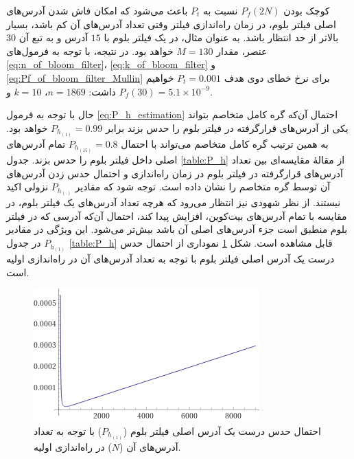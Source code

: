 کوچک بودن 
$P_f(2N)$
نسبت به  
$P_t$
باعث می‌شود که امکان فاش شدن آدرس‌های اصلی فیلتر بلوم، در زمان راه‌اندازی فیلتر وقتی تعداد آدرس‌های آن کم باشد، بسیار بالاتر از حد انتظار باشد. به عنوان مثال، در یک فیلتر بلوم با $15$ آدرس و به تبع آن $30$ عنصر، مقدار $M=130$ خواهد بود. در نتیجه، با توجه به فرمول‌های 
\eqref{eq:n_of_bloom_filter}،
\eqref{eq:k_of_bloom_filter} و
\eqref{eq:Pf_of_bloom_filter_Mullin}
 برای نرخ خطای دوی هدف
$P_t=0.001$
 خواهیم داشت:
$n=1869$،
$k=10$ و
$P_f(30)=5.1\times10^{-9}$.

حال با توجه به فرمول \eqref{eq:P_h_estimation} احتمال آن‌که گره کامل متخاصم بتواند  یکی از آدرس‌های قرارگرفته در فیلتر بلوم را حدس بزند برابر 
$P_{h_{(1)}} = 0.99$
خواهد بود. به همین ترتیب گره کامل متخاصم می‌تواند با احتمال
$P_{h_{(15)}} = 0.8$
تمام آدرس‌های اصلی داخل فیلتر بلوم را حدس بزند. جدول \ref{table:P_h} از مقالهٔ \cite{Gervais2014} مقایسه‌ای بین تعداد آدرس‌های قرارگرفته در فیلتر بلوم در زمان راه‌اندازی و احتمال حدس زدن آدرس‌های آن توسط گره متخاصم را نشان داده است. توجه شود که مقادیر
$P_{h_{(.)}}$
نزولی اکید نیستند. از نظر شهودی نیز انتظار می‌رود که هرچه تعداد آدرس‌های یک فیلتر بلوم، در مقایسه با تمام آدرس‌های بیت‌کوین، افزایش پیدا کند، احتمال آن‌که آدرسی که در فیلتر بلوم منطبق است جزء آدرس‌های اصلی آن باشد بیش‌تر می‌شود. این ویژگی در مقادیر 
$P_{h_{(1)}}$
در جدول \ref{table:P_h} قابل مشاهده است. شکل \ref{fig:ph1} نموداری از احتمال حدس درست یک آدرس اصلی فیلتر بلوم با توجه به تعداد آدرس‌های آن در راه‌اندازی اولیه است. 
\begin{figure}
	\centering
	\includegraphics[width=0.7\linewidth]{image/P_h_1}
	\caption{%
		احتمال حدس درست یک آدرس اصلی فیلتر بلوم 
		($P_{h_{(1)}}$)
		با توجه به تعداد آدرس‌های آن ($N$) در راه‌اندازی اولیه.}
	\label{fig:ph1}
\end{figure}


